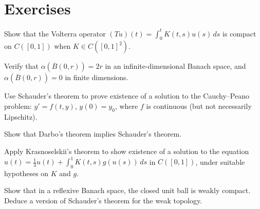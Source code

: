 \section{Exercises}

\begin{exercise}
Show that the Volterra operator $(Tu)(t) = \int_0^t K(t,s) u(s) \, ds$ is
compact on $C([0,1])$ when $K \in C([0,1]^2)$.
\end{exercise}

\begin{exercise}
Verify that $\alpha(\overline{B}(0, r)) = 2r$ in an infinite-dimensional Banach
space, and $\alpha(\overline{B}(0, r)) = 0$ in finite dimensions.
\end{exercise}

\begin{exercise}
Use Schauder's theorem to prove existence of a solution to the Cauchy--Peano
problem: $y' = f(t,y)$, $y(0) = y_0$, where $f$ is continuous (but not
necessarily Lipschitz).
\end{exercise}

\begin{exercise}
Show that Darbo's theorem implies Schauder's theorem.
\end{exercise}

\begin{exercise}
Apply Krasnoselskii's theorem to show existence of a solution to the equation
$u(t) = \frac{1}{3} u(t) + \int_0^1 K(t,s) g(u(s)) \, ds$ in $C([0,1])$,
under suitable hypotheses on $K$ and $g$.
\end{exercise}

\begin{exercise}
Show that in a reflexive Banach space, the closed unit ball is weakly compact.
Deduce a version of Schauder's theorem for the weak topology.
\end{exercise}
